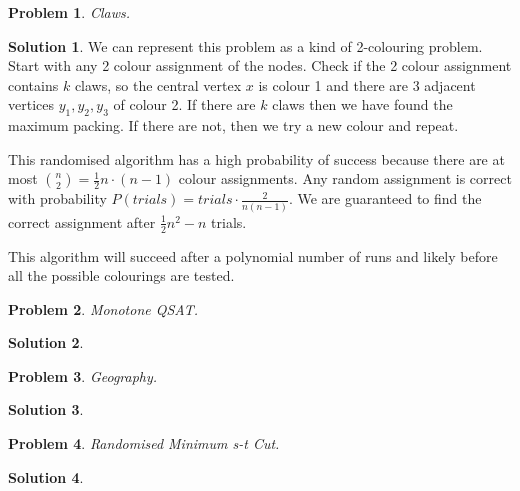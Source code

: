 \documentclass{article}
\newtheorem{problem}{Problem}
\theoremstyle{definition}
\newtheorem*{solution}{Solution}
\begin{document}
\begin{problem} 

Claws.

\end{problem}

\begin{solution}

We can represent this problem as a kind of 2-colouring problem. Start with any 2 colour assignment of the nodes. Check if the 2 colour assignment contains \(k\) claws, so the central vertex \(x\) is colour 1 and there are 3 adjacent vertices \(y_1,y_2,y_3\) of colour 2. If there are \(k\) claws then we have found the maximum packing. If there are not, then we try a new colour and repeat.

This randomised algorithm has a high probability of success because there are at most \(n \choose 2\)\( = \frac{1}{2} n\cdot (n-1) \) colour assignments. Any random assignment is correct with probability \(P(trials)=trials\cdot \frac{2}{n(n-1)}\). We are guaranteed to find the correct assignment after \(\frac{1}{2} n^2 - n\) trials.

This algorithm will succeed after a polynomial number of runs and likely before all the possible colourings are tested.

\end{solution}

\begin{problem} 

Monotone QSAT.

\end{problem}

\begin{solution}

\end{solution}

\begin{problem} 

Geography.

\end{problem}

\begin{solution}

\end{solution}

\begin{problem} 

Randomised Minimum s-t Cut.

\end{problem}

\begin{solution}

\end{solution}
\end{document}
